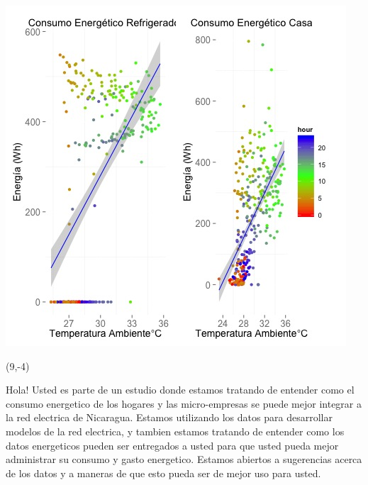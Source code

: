 \documentclass{article}\usepackage[]{graphicx}\usepackage[]{color}
\newenvironment{knitrout}{}{} %
\begin{document}
\begin{knitrout}
\color{fgcolor}
\includegraphics[scale=0.75]{figure/A16_correlaciones} 
\end{knitrout}

 \begin{textblock}{1}(9,-4)
\begin{minipage}{20em}
\begingroup

\endgroup
\end{minipage}
\end{textblock}

\vspace{70px}
\begin{knitrout}
Hola! Usted es parte de un estudio donde estamos tratando de entender como el consumo energetico de los hogares y las micro-empresas se puede mejor integrar a la red electrica de Nicaragua. Estamos utilizando los datos para desarrollar modelos de la red electrica, y tambien estamos tratando de entender como los datos energeticos pueden ser entregados a usted para que usted pueda mejor administrar su consumo y gasto energetico.  Estamos abiertos a sugerencias acerca de los datos y a maneras de que esto pueda ser de mejor uso para usted.
\end{knitrout}
\end{document}
